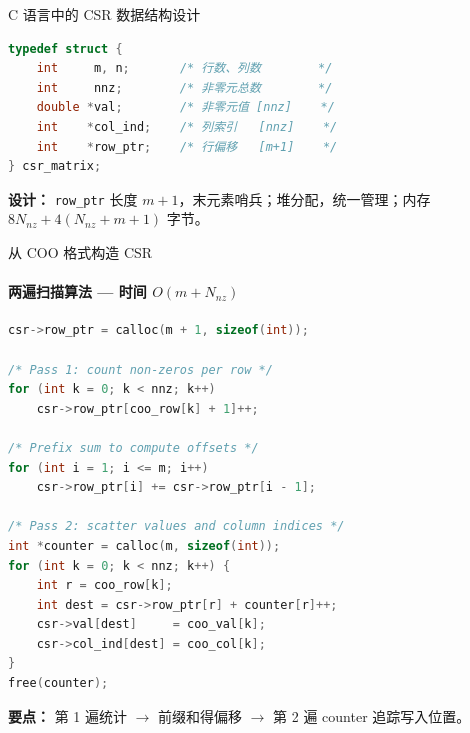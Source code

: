 \documentclass[12pt,aspectratio=169]{beamer}
\begin{document}
\begin{frame}[fragile]{C 语言中的 CSR 数据结构设计}

\begin{lstlisting}[language=C,basicstyle=\ttfamily\footnotesize]
typedef struct {
    int     m, n;       /* 行数、列数        */
    int     nnz;        /* 非零元总数        */
    double *val;        /* 非零元值 [nnz]    */
    int    *col_ind;    /* 列索引   [nnz]    */
    int    *row_ptr;    /* 行偏移   [m+1]    */
} csr_matrix;
\end{lstlisting}

\vspace{2pt}
\small
\textbf{设计：} \texttt{row\_ptr} 长度 $m+1$，末元素哨兵；堆分配，统一管理；内存 $8N_{\!nz} + 4(N_{\!nz}+m+1)$ 字节。
\end{frame}

\begin{frame}[fragile]{从 COO 格式构造 CSR}
\framesubtitle{两遍扫描算法 — 时间 $O(m+N_{\!nz})$}

\scriptsize
\begin{lstlisting}[language=C,basicstyle=\ttfamily\scriptsize,belowskip=-4pt]
csr->row_ptr = calloc(m + 1, sizeof(int));

/* Pass 1: count non-zeros per row */
for (int k = 0; k < nnz; k++)
    csr->row_ptr[coo_row[k] + 1]++;

/* Prefix sum to compute offsets */
for (int i = 1; i <= m; i++)
    csr->row_ptr[i] += csr->row_ptr[i - 1];

/* Pass 2: scatter values and column indices */
int *counter = calloc(m, sizeof(int));
for (int k = 0; k < nnz; k++) {
    int r = coo_row[k];
    int dest = csr->row_ptr[r] + counter[r]++;
    csr->val[dest]     = coo_val[k];
    csr->col_ind[dest] = coo_col[k];
}
free(counter);
\end{lstlisting}

\footnotesize
\textbf{要点：} 第 1 遍统计 $\to$ 前缀和得偏移 $\to$ 第 2 遍 counter 追踪写入位置。
\end{frame}
\end{document}
